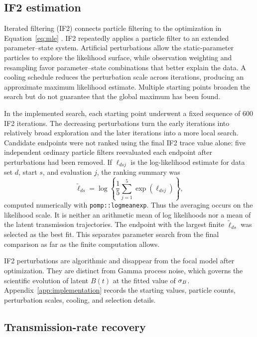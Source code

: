 \subsection{IF2 estimation}

Iterated filtering (IF2) connects particle filtering to the optimization in
Equation~\ref{eq:mle} \citep{ionides2015if2}.  IF2 repeatedly applies a particle
filter to an extended parameter--state system.  Artificial perturbations allow
the static-parameter particles to explore the likelihood surface, while
observation weighting and resampling favor parameter--state combinations that
better explain the data.  A cooling schedule reduces the perturbation scale
across iterations, producing an approximate maximum likelihood estimate.
Multiple starting points broaden the search but do not guarantee that the
global maximum has been found.

In the implemented search, each starting point underwent a fixed sequence of
600 IF2 iterations.  The decreasing perturbations turn the early iterations
into relatively broad exploration and the later iterations into a more local
search.  Candidate endpoints were not ranked using the final IF2 trace value
alone: five independent ordinary particle filters reevaluated each endpoint
after perturbations had been removed.  If \(\ell_{dsj}\) is the log-likelihood
estimate for data set \(d\), start \(s\), and evaluation \(j\), the ranking
summary was
\begin{equation}
\widetilde\ell_{ds}
=
\log\left\{\frac{1}{5}\sum_{j=1}^{5}\exp(\ell_{dsj})\right\},
\label{eq:logmeanexp}
\end{equation}
computed numerically with \texttt{pomp::logmeanexp}.  Thus the averaging occurs
on the likelihood scale.  It is neither an arithmetic mean of log likelihoods
nor a mean of the latent transmission trajectories.  The endpoint with the
largest finite \(\widetilde\ell_{ds}\) was selected as the best fit.  This
separates parameter search from the final comparison as far as the finite
computation allows.

IF2 perturbations are algorithmic and disappear from the focal model after
optimization.  They are distinct from Gamma process noise, which governs the
scientific evolution of latent \(B(t)\) at the fitted value of \(\sigma_B\).
Appendix~\ref{app:implementation} records the starting values, particle counts,
perturbation scales, cooling, and selection details.

\subsection{Transmission-rate recovery}

